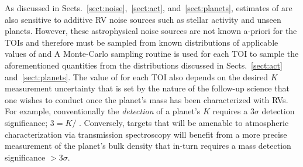 As discussed in Sects.~\ref{sect:noise},~\ref{sect:act}, and~\ref{sect:planets}, estimates of
\nrv{} are also sensitive to additive RV noise sources such as stellar activity and unseen planets.
However, these astrophysical noise sources are not known a-priori for the 
TOIs and therefore must be sampled from known distributions of applicable values of \sigact{}
and  A Monte-Carlo sampling routine is used for each TOI to sample the aforementioned
quantities from the distributions discussed in Sects.~\ref{sect:act} and~\ref{sect:planets}.
The value of \nrv{} for each TOI also depends on the desired $K$ measurement uncertainty
that is set by the nature of the
follow-up science that one wishes to conduct once the planet's mass has been characterized with RVs.
For example, conventionally the \emph{detection} of a planet's $K$ requires a $3\sigma$ detection
significance; $3 = K/$ \sigK{}. Conversely, targets that will be amenable to atmospheric
characterization via transmission spectroscopy will benefit from a more precise measurement of the
planet's bulk density that in-turn requires a mass detection significance $>3\sigma$.

